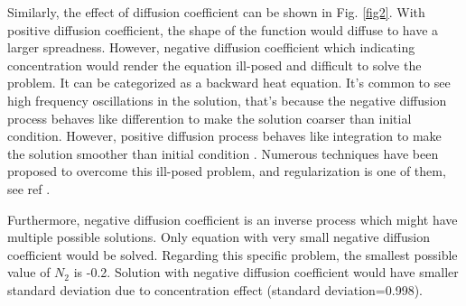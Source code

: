 \documentclass[12pt]{article}
\begin{document}
Similarly, the effect of diffusion coefficient can be shown in Fig. \ref{fig2}. 
With positive diffusion coefficient, the shape of the function would diffuse to have a larger spreadness. However, negative diffusion coefficient which indicating concentration would render the equation ill-posed and difficult to solve the problem. It can be categorized as a backward heat equation. It's common to see high frequency oscillations in the solution, that's because the negative diffusion process behaves like differention to make the solution coarser than initial condition. However, positive diffusion process behaves like integration to make the solution smoother than initial condition \cite{Threfethen}. Numerous techniques have been proposed to overcome this ill-posed problem, and regularization is one of them, see ref \cite{Fu}. 

Furthermore, negative diffusion coefficient is an inverse process which might have multiple possible solutions. Only equation with very small negative diffusion coefficient would be solved. Regarding this specific problem, the smallest possible value of $N_2$ is -0.2. Solution with negative diffusion coefficient would have smaller standard deviation due to concentration effect (standard deviation=0.998). 
\end{document}
